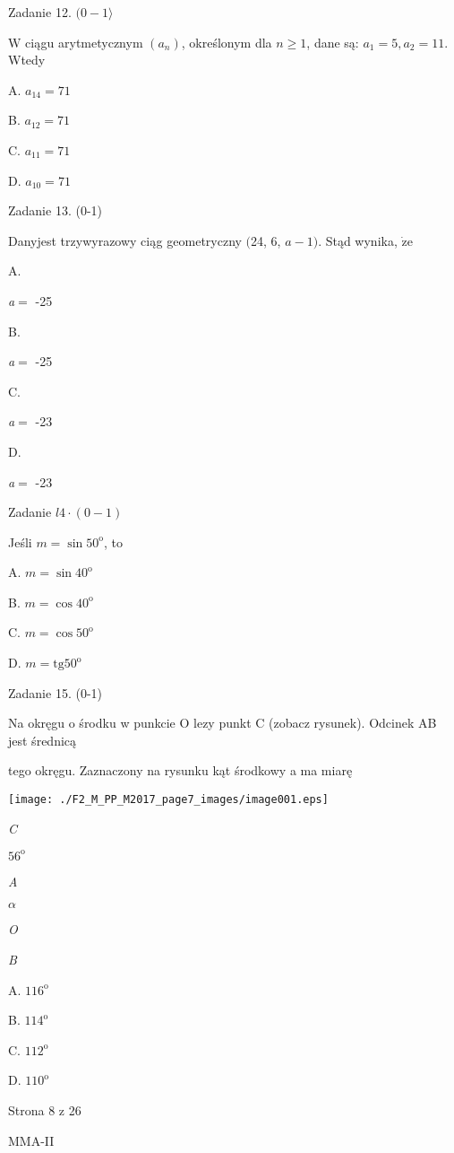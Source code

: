 \documentclass[a4paper,12pt]{article}
\begin{document}
Zadanie 12. $(0-1\rangle$

$\mathrm{W}$ ciągu arytmetycznym $(a_{n})$, określonym dla $n\geq 1$, dane są: $a_{1}=5, a_{2}=11$. Wtedy

A. $a_{14}=71$

B. $a_{12}=71$

C. $a_{11}=71$

D. $a_{10}=71$

Zadanie 13. (0-1)

Danyjest trzywyrazowy ciąg geometryczny $($24, 6, $a-1)$. Stąd wynika, $\dot{\mathrm{z}}\mathrm{e}$

A.

{\it a}$=$ -25

B.

{\it a}$=$ -25

C.

{\it a}$=$ -23

D.

{\it a}$=$ -23

Zadanie $l4\cdot(0-1)$

Jeśli $m=\sin 50^{\mathrm{o}}$, to

A. $m=\sin 40^{\mathrm{o}}$

B. $m=\cos 40^{\mathrm{o}}$

C. $m=\cos 50^{\mathrm{o}}$

D. $m=\mathrm{t}\mathrm{g}50^{\mathrm{o}}$

Zadanie 15. (0-1)

Na okręgu o środku w punkcie O lezy punkt C (zobacz rysunek). Odcinek AB jest średnicą

tego okręgu. Zaznaczony na rysunku kąt środkowy a ma miarę
\begin{center}
\texttt{[image: ./F2\_M\_PP\_M2017\_page7\_images/image001.eps]}
\end{center}
{\it C}

$56^{\mathrm{o}}$

{\it A}

$\alpha$

{\it O}

{\it B}

A. $116^{\mathrm{o}}$

B. $114^{\mathrm{o}}$

C. $112^{\mathrm{o}}$

D. $110^{\mathrm{o}}$

Strona 8 z 26

MMA-II
\end{document}
